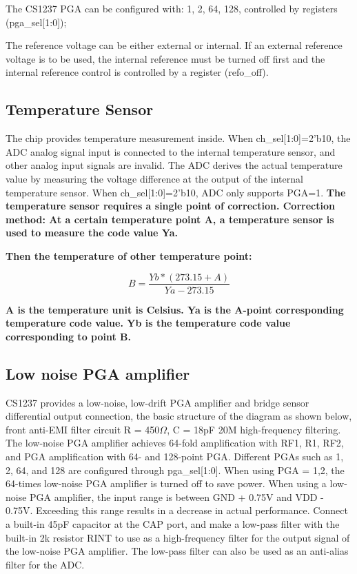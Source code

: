 \documentclass{article}
\begin{document}
The CS1237 PGA can be configured with: 1, 2, 64, 128, controlled by registers (pga\_sel[1:0]);

The reference voltage can be either external or internal. If an external reference voltage is to be used,
the internal reference must be turned off first and the internal reference control is controlled by a
register (refo\_off).

\subsection{Temperature Sensor}

The chip provides temperature measurement inside. When ch\_sel[1:0]=2'b10, the ADC analog signal input is
connected to the internal temperature sensor, and other analog input signals are invalid. The ADC derives
the actual temperature value by measuring the voltage difference at the output of the internal
temperature sensor. When ch\_sel[1:0]=2’b10, ADC only supports PGA=1. \textbf{The temperature sensor
requires a single point of correction. Correction method: At a certain temperature point A, a temperature
sensor is used to measure the code value Ya.} 

\textbf{Then the temperature of other temperature point: }

\begin{equation}
B = \frac{Yb*(273.15 + A)}{Ya-273.15}
\end{equation}

\textbf{A is the temperature unit is Celsius. Ya is the A-point corresponding temperature code value. 
Yb is the temperature code value corresponding to point B.}

\pagebreak

\subsection{Low noise PGA amplifier}

CS1237 provides a low-noise, low-drift PGA amplifier and bridge sensor differential output connection,
the basic structure of the diagram as shown below, front anti-EMI filter circuit R = 450$\Omega$, C = 18pF 20M
high-frequency filtering.
The low-noise PGA amplifier achieves 64-fold amplification with RF1, R1, RF2, and PGA amplification with
64- and 128-point PGA.
Different PGAs such as 1, 2, 64, and 128 are configured through pga\_sel[1:0].
When using PGA = 1,2, the 64-times low-noise PGA amplifier is turned off to save power.
When using a low-noise PGA amplifier, the input range is between GND + 0.75V and VDD - 0.75V. 
Exceeding this range results in a decrease in actual performance.
Connect a built-in 45pF capacitor at the CAP port, and make a low-pass filter with the built-in 2k
resistor RINT to use as a high-frequency filter for the output signal of the low-noise PGA amplifier. 
The low-pass filter can also be used as an anti-alias filter for the ADC.
\end{document}
